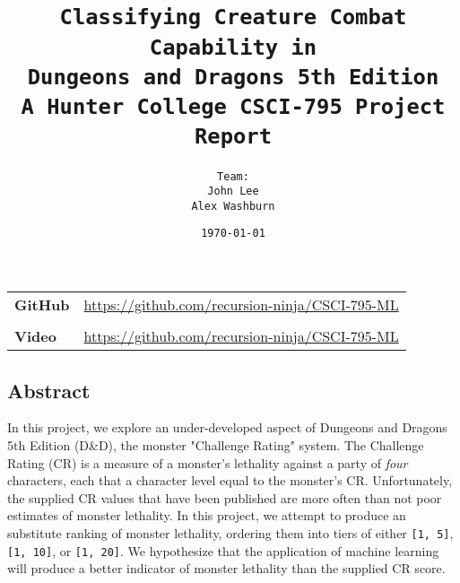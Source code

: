 \documentclass[12pt]{diazessay}
\title{\texttt{\LARGE{Classifying Creature Combat Capability in \\Dungeons and Dragons 5th Edition} \\\vspace{1em} {\large A Hunter College CSCI-795 Project Report}}} %
\author{\texttt{{\Huge Team:}\\\vspace*{-0.5em}
		John Lee \\\vspace*{-0.25em}
		Alex Washburn}} %
\date{\texttt{\today}} %
\begin{document}
	

\maketitle %

	
\pagebreak


\clearpage


\vspace*{\fill}
\begin{center}
	\begin{minipage}{.75\textwidth}
		
\tableofcontents
\vspace*{0.5cm}
\begin{longtable}[]{@{}lc@{}}
{\bfseries GitHub} & \url{https://github.com/recursion-ninja/CSCI-795-ML} \\
& \\
{\bfseries Video } & \url{https://github.com/recursion-ninja/CSCI-795-ML} \\
\end{longtable}
		
	\end{minipage}
\end{center}
\vfill %
\clearpage


\pagebreak


\clearpage
\vspace*{\fill}
\begin{center}
	\begin{minipage}{.9\textwidth}
\hypertarget{abstract}{%
\section{Abstract}\label{abstract}}

In this project, we explore an under-developed aspect of Dungeons and
Dragons 5th Edition (D\&D), the monster "Challenge Rating" system. The
Challenge Rating (CR) is a measure of a monster's lethality against a
party of \emph{four} characters, each that a character level equal to
the monster's CR. Unfortunately, the supplied CR values that have been
published are more often than not poor estimates of monster lethality.
In this project, we attempt to produce an substitute ranking of monster
lethality, ordering them into tiers of either \texttt{{[}1,\ 5{]}},
\texttt{{[}1,\ 10{]}}, or \texttt{{[}1,\ 20{]}}. We hypothesize that the
application of machine learning will produce a better indicator of
monster lethality than the supplied CR score.
	\end{minipage}
\end{center}
\vfill %
\clearpage
\pagebreak
\end{document}
